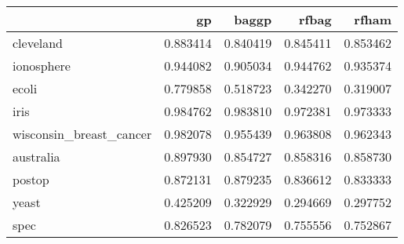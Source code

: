 \begin{tabular}{lrrrr}
\toprule
{} &        gp &     baggp &     rfbag &     rfham \\
\midrule
cleveland               &  0.883414 &  0.840419 &  0.845411 &  0.853462 \\
ionosphere              &  0.944082 &  0.905034 &  0.944762 &  0.935374 \\
ecoli                   &  0.779858 &  0.518723 &  0.342270 &  0.319007 \\
iris                    &  0.984762 &  0.983810 &  0.972381 &  0.973333 \\
wisconsin\_breast\_cancer &  0.982078 &  0.955439 &  0.963808 &  0.962343 \\
australia               &  0.897930 &  0.854727 &  0.858316 &  0.858730 \\
postop                  &  0.872131 &  0.879235 &  0.836612 &  0.833333 \\
yeast                   &  0.425209 &  0.322929 &  0.294669 &  0.297752 \\
spec                    &  0.826523 &  0.782079 &  0.755556 &  0.752867 \\
\bottomrule
\end{tabular}
